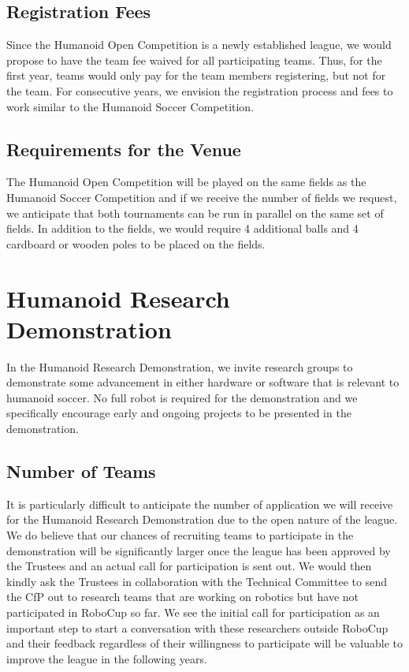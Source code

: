\documentclass{article}
\begin{document}
\subsection{Registration Fees}

Since the Humanoid Open Competition is a newly established league, we would propose to have the team fee waived for all participating teams. Thus, for the first year, teams would only pay for the team members registering, but not for the team. For consecutive years, we envision the registration process and fees to work similar to the Humanoid Soccer Competition.

\subsection{Requirements for the Venue}
The Humanoid Open Competition will be played on the same fields as the Humanoid Soccer Competition and if we receive the number of fields we request, we anticipate that both tournaments can be run in parallel on the same set of fields. In addition to the fields, we would require 4 additional balls and 4 cardboard or wooden poles to be placed on the fields. 

\section{Humanoid Research Demonstration}
In the Humanoid Research Demonstration, we invite research groups to demonstrate some advancement in either hardware or software that is relevant to humanoid soccer. No full robot is required for the demonstration and we specifically encourage early and ongoing projects to be presented in the demonstration.

\subsection{Number of Teams}

It is particularly difficult to anticipate the number of application we will
receive for the Humanoid Research Demonstration due to the open nature of the league. We do believe that our chances of recruiting teams to participate in the demonstration will be significantly larger once the league has been approved by the Trustees and an actual call for participation is sent out. We would then kindly ask the Trustees in collaboration with the Technical Committee to send the CfP out to research teams that are working on robotics but have not participated in RoboCup so far. We see the initial call for participation as an important step to start a conversation with these researchers outside RoboCup and their feedback regardless of their willingness to participate will be valuable to improve the league in the following years. 
\end{document}
